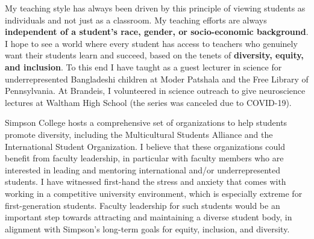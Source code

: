 \documentclass[a4paper,11pt]{article}
\begin{document}
My teaching style has always been driven by this principle of viewing students as individuals and not just as a classroom. My teaching efforts are always \textbf{independent of a student's race, gender, or socio-economic background}. I hope to see a world where every student has access to teachers who genuinely want their students learn and succeed, based on the tenets of \textbf{diversity, equity, and inclusion}. To this end I have taught as a guest lecturer in science for underrepresented Bangladeshi children at Moder Patshala and the Free Library of Pennsylvania. At Brandeis, I volunteered in science outreach to give neuroscience lectures at Waltham High School (the series was canceled due to COVID-19).

Simpson College hosts a comprehensive set of organizations to help students promote diversity, including the Multicultural Students Alliance and the International Student Organization. I believe that these organizations could benefit from faculty leadership, in particular with faculty members who are interested in leading and mentoring international and/or underrepresented students. I have witnessed first-hand the stress and anxiety that comes with working in a competitive university environment, which is especially extreme for first-generation students. Faculty leadership for such students would be an important step towards attracting and maintaining a diverse student body, in alignment with Simpson's long-term goals for equity, inclusion, and diversity.




\end{document}
